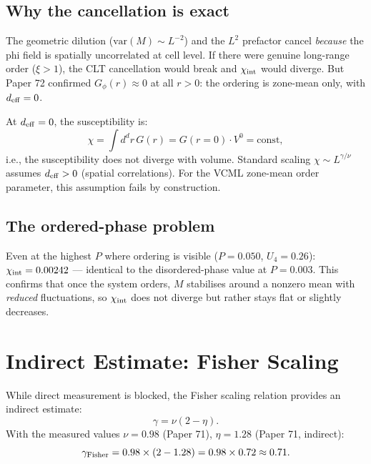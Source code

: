 \documentclass[11pt,a4paper]{article}
\begin{document}
\subsection{Why the cancellation is exact}

The geometric dilution ($\mathrm{var}(M) \sim L^{-2}$) and the $L^2$ prefactor
cancel \emph{because} the phi field is spatially uncorrelated at cell level.
If there were genuine long-range order ($\xi > 1$), the CLT cancellation would break
and $\chi_{\rm int}$ would diverge.  But Paper 72 confirmed $G_\phi(r) \approx 0$
at all $r > 0$: the ordering is zone-mean only, with $d_{\rm eff} = 0$.

At $d_{\rm eff} = 0$, the susceptibility is:
\begin{equation}
  \chi = \int d^d r\, G(r) = G(r=0) \cdot V^0 = \mathrm{const},
\end{equation}
i.e., the susceptibility does not diverge with volume.  Standard scaling
$\chi \sim L^{\gamma/\nu}$ assumes $d_{\rm eff} > 0$ (spatial correlations).
For the VCML zone-mean order parameter, this assumption fails by construction.

\subsection{The ordered-phase problem}

Even at the highest $P$ where ordering is visible ($P = 0.050$, $U_4 = 0.26$):
$\chi_{\rm int} = 0.00242$ --- identical to the disordered-phase value at $P=0.003$.
This confirms that once the system orders, $M$ stabilises around a nonzero mean
with \emph{reduced} fluctuations, so $\chi_{\rm int}$ does not diverge but
rather stays flat or slightly decreases.

\section{Indirect Estimate: Fisher Scaling}

While direct measurement is blocked, the Fisher scaling relation provides
an indirect estimate:
\begin{equation}
  \gamma = \nu(2 - \eta).
\end{equation}
With the measured values $\nu = 0.98$ (Paper 71), $\eta = 1.28$ (Paper 71, indirect):
\begin{equation}
  \gamma_{\rm Fisher} = 0.98 \times (2 - 1.28) = 0.98 \times 0.72 \approx 0.71.
\end{equation}
\end{document}
